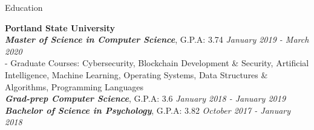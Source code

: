 \documentclass{resume} %
\begin{document}

\begin{rSection}{Education}

{\bf Portland State University} 
  \\{\bf {\em Master of Science in Computer Science}}, { G.P.A: 3.74 }\hfill {\em January 2019 - March 2020}
  \\{ \small{ \hspace{10mm} - Graduate Courses:}} {\small{Cybersecurity, Blockchain Development \& Security, Artificial Intelligence, Machine Learning, Operating Systems, Data Structures \& Algorithms, Programming Languages}}
  \\ {\bf \em Grad-prep Computer Science}, { G.P.A: 3.6 }\hfill {\em January 2018 - January 2019}
  \\ {\bf \em Bachelor of Science in Psychology}, { G.P.A: 3.82 }\hfill {\em October 2017 - January 2018}  


\end{rSection}
\end{document}
